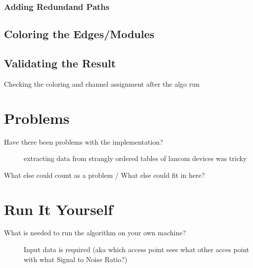     \subsubsection{Adding Redundand Paths}
  \subsection{Coloring the Edges/Modules}
  \subsection{Validating the Result}
    Checking the coloring and channel assignment after the algo run
\section{Problems}
  \begin{description}
   \item[Have there been problems with the implementation?]
   extracting data from strangly ordered tables of lancom devices was tricky
   \item[What else could count as a problem / What else could fit in here?]
  \end{description}
\section{Run It Yourself}
  \begin{description}
   \item[What is needed to run the algorithm on your own machine?]
    Input data is required (aka which access point sees what other acces point with what Signal to Noise Ratio?) \newline
  \end{description}
